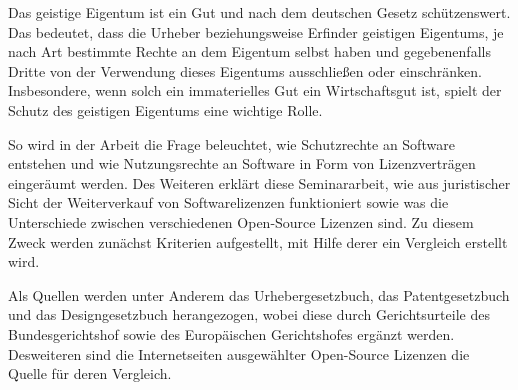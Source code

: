 Das geistige Eigentum ist ein Gut und nach dem deutschen Gesetz schützenswert. Das bedeutet, dass die Urheber beziehungsweise Erfinder geistigen Eigentums, je nach Art bestimmte Rechte
an dem Eigentum selbst haben und gegebenenfalls Dritte von der Verwendung dieses Eigentums ausschließen oder einschränken. Insbesondere, wenn solch ein immaterielles Gut
ein Wirtschaftsgut ist, spielt der Schutz des geistigen Eigentums eine wichtige Rolle.

So wird in der Arbeit die Frage beleuchtet, wie Schutzrechte an Software entstehen und wie Nutzungsrechte an Software in Form von Lizenzverträgen eingeräumt werden.
Des Weiteren erklärt diese Seminararbeit, wie aus juristischer Sicht der Weiterverkauf von Softwarelizenzen funktioniert sowie was die Unterschiede zwischen
verschiedenen Open-Source Lizenzen sind. Zu diesem Zweck werden zunächst Kriterien aufgestellt, mit Hilfe derer ein Vergleich erstellt wird.

Als Quellen werden unter Anderem das Urhebergesetzbuch, das Patentgesetzbuch und das Designgesetzbuch herangezogen, wobei
diese durch Gerichtsurteile des Bundesgerichtshof sowie des Europäischen Gerichtshofes ergänzt werden. Desweiteren sind die Internetseiten ausgewählter
Open-Source Lizenzen die Quelle für deren Vergleich.
